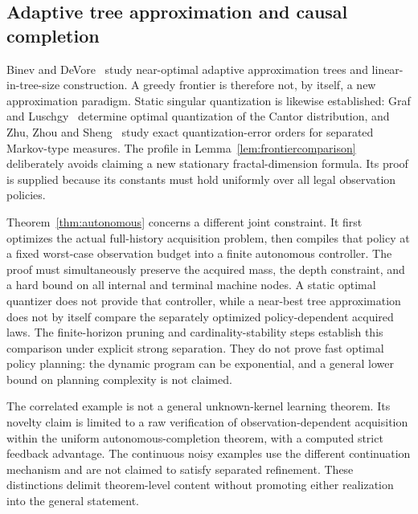 \subsection{Adaptive tree approximation and causal completion}
Binev and DeVore~\cite{binevdevore} study near-optimal adaptive approximation trees and linear-in-tree-size construction. A greedy frontier is therefore not, by itself, a new approximation paradigm. Static singular quantization is likewise established: Graf and Luschgy~\cite{cantorquant} determine optimal quantization of the Cantor distribution, and Zhu, Zhou and Sheng~\cite{markovquant} study exact quantization-error orders for separated Markov-type measures. The profile in Lemma~\ref{lem:frontiercomparison} deliberately avoids claiming a new stationary fractal-dimension formula. Its proof is supplied because its constants must hold uniformly over all legal observation policies.

Theorem~\ref{thm:autonomous} concerns a different joint constraint. It first optimizes the actual full-history acquisition problem, then compiles that policy at a fixed worst-case observation budget into a finite autonomous controller. The proof must simultaneously preserve the acquired mass, the depth constraint, and a hard bound on all internal and terminal machine nodes. A static optimal quantizer does not provide that controller, while a near-best tree approximation does not by itself compare the separately optimized policy-dependent acquired laws. The finite-horizon pruning and cardinality-stability steps establish this comparison under explicit strong separation. They do not prove fast optimal policy planning: the dynamic program can be exponential, and a general lower bound on planning complexity is not claimed.

The correlated example is not a general unknown-kernel learning theorem. Its novelty claim is limited to a raw verification of observation-dependent acquisition within the uniform autonomous-completion theorem, with a computed strict feedback advantage. The continuous noisy examples use the different continuation mechanism and are not claimed to satisfy separated refinement. These distinctions delimit theorem-level content without promoting either realization into the general statement.
